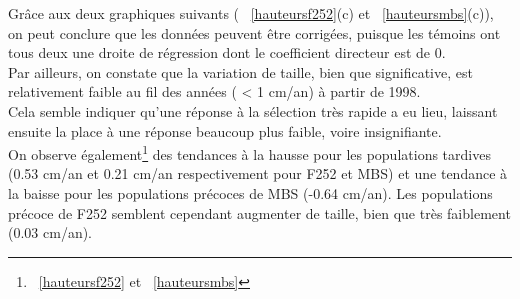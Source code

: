 \documentclass[12pt,a4paper]{article}
\begin{document}
				Grâce aux deux graphiques suivants ( ~\ref{hauteursf252}(c) et ~\ref{hauteursmbs}(c)), on peut conclure que les données peuvent être corrigées, puisque les témoins ont tous deux une droite de régression dont le coefficient directeur est de 0.\\
				
				Par ailleurs, on constate que la variation de taille, bien que significative, est relativement faible au fil des années ( < 1 cm/an) à partir de 1998.\\
				Cela semble indiquer qu'une réponse à la sélection très rapide a eu lieu, laissant ensuite la place à une réponse beaucoup plus faible, voire insignifiante.\\
	
				On observe également\footnote{~\ref{hauteursf252} et ~\ref{hauteursmbs}} des tendances à la hausse pour les populations tardives (0.53 cm/an et 0.21 cm/an respectivement pour F252 et MBS) et une tendance à la baisse pour les populations précoces de MBS (-0.64 cm/an). Les populations précoce de F252 semblent cependant augmenter de taille, bien que très faiblement (0.03 cm/an).\\
				
\end{document}

